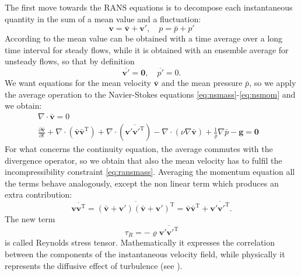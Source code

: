 The first move towards the RANS equations is to decompose each instantaneous 
quantity in the sum of a mean value and a fluctuation: 
\begin{equation} \label{eq:decomp}
\mathbf{v} = \bar{\mathbf{v}} + \mathbf{v}', \quad p = \bar{p} + p'
\end{equation}
According to \cite{main:vermal} the mean value can be obtained with a time 
average over a long time interval 
for steady flows, while it is obtained with an ensemble average for unsteady 
flows, so that by definition
\begin{equation}
	\overline{\mathbf{v}'} = \mathbf{0}, \quad \overline{p'}=0.
\end{equation}
We want equations for the mean 
velocity $\bar{\mathbf{v}}$ and the mean pressure $\bar{p}$, so we apply the 
average operation to the Navier-Stokes equations 
\eqref{eq:nsmass}-\eqref{eq:nsmom} and we obtain:
\begin{align}
\label{eq:ransmass} \nabla \cdot \bar{\mathbf{v}} = 0&\\
\label{eq:ransmom} \frac{\partial \bar{\mathbf{v}}}{\partial t} + \nabla \cdot 
( 
\bar{\mathbf{v}} \bar{\mathbf{v}}^\mathrm{T}) + \nabla \cdot 
(\overline{\mathbf{v}' {\mathbf{v}'}^\mathrm{T}})- \nabla \cdot (\nu \nabla 
\bar{\mathbf{v}}) +\frac{1}{\varrho} \nabla \bar{p} - \mathbf{g} = \mathbf{0}&
\end{align}
For what concerns the continuity equation, the average commutes with the 
divergence operator, so we obtain that also the mean velocity has to fulfil the 
incompressibility constraint \eqref{eq:ransmass}. Averaging the momentum 
equation all the terms behave analogously, except the non linear term which 
produces an extra contribution:
\begin{equation}
	\overline{\mathbf{v} \mathbf{v}^\mathrm{T}} = \overline{(\bar{\mathbf{v}} + 
	\mathbf{v}') (\bar{\mathbf{v}} + \mathbf{v}')^\mathrm{T}} = 
	\bar{\mathbf{v}} \bar{\mathbf{v}}^\mathrm{T} + \overline{\mathbf{v}' 
	{\mathbf{v}'}^\mathrm{T}}.
\end{equation}
The new term
\begin{equation}
\tau_R = -\varrho \overline{\mathbf{v}' {\mathbf{v}'}^\mathrm{T}}
\end{equation}
is called Reynolds stress tensor. Mathematically it expresses the correlation 
between the components of the instantaneous velocity field, while physically it 
represents the diffusive effect of turbulence (see \cite{main:vermal}).
%
